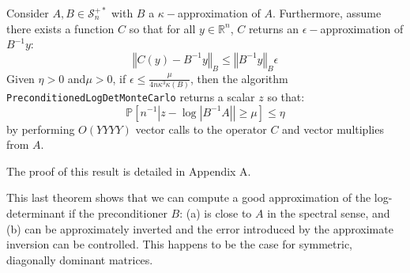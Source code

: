 \begin{theorem}\label{thm:preconditioning-approx}Consider $A,B\in\mathcal{S}_{n}^{+*}$
with $B$ a $\kappa-$approximation of $A$. Furthermore, assume there
exists a function $C$ so that for all $y\in\mathbb{R}^{n}$, $C$
returns an $\epsilon-$approximation of $B^{-1}y$:
\[
\left\Vert C\left(y\right)-B^{-1}y\right\Vert _{B}\leq\left\Vert B^{-1}y\right\Vert _{B}\epsilon
\]
Given $\eta>0$ and$\mu>0$, if $\epsilon\leq\frac{\mu}{4n\kappa^{3}\kappa\left(B\right)}$,
then the algorithm \texttt{PreconditionedLogDetMonteCarlo} returns
a scalar $z$ so that:
\[
\mathbb{P}\left[n^{-1}\left|z-\log\left|B^{-1}A\right|\right|\geq\mu\right]\leq\eta
\]
by performing $O\left(YYYY\right)$ vector calls to the operator $C$
and vector multiplies from $A$. 

\end{theorem}

The proof of this result is detailed in Appendix A.

This last theorem shows that we can compute a good approximation of
the log-determinant if the preconditioner $B$: (a) is close to $A$
in the spectral sense, and (b) can be approximately inverted and the
error introduced by the approximate inversion can be controlled. This
happens to be the case for symmetric, diagonally dominant matrices.
